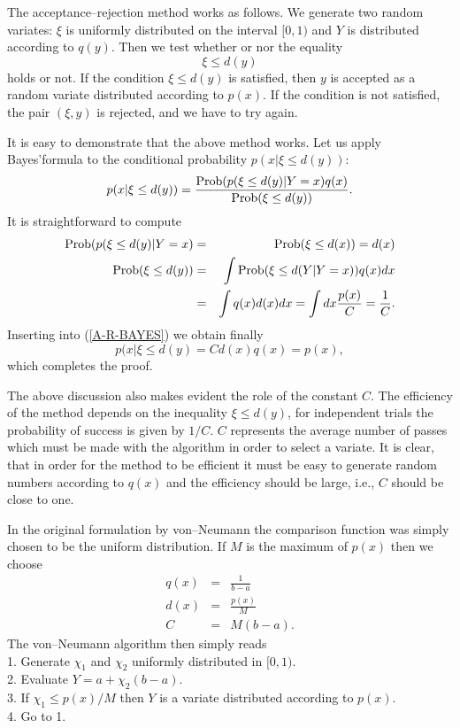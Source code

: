 The acceptance--rejection method works as follows. We generate two
random variates: $\xi$ is uniformly distributed on the interval
$[0,1)$ and $Y$ is distributed according to $q(y)$. Then we test
whether or nor the equality
\begin{equation*}
\xi \le d(y)
\end{equation*}
holds or not. If  the condition $\xi \le d(y)$ is satisfied, 
then $y$ is accepted as 
a random variate distributed according to $p(x)$.  If
the condition is not satisfied, the pair $(\xi,y)$ is rejected, 
and we have to try again.

It is easy to demonstrate that the above method works. Let us apply
Bayes'formula to the conditional probability $p(x|\xi \le d(y))$:
\begin{equation}
\label{A-R-BAYES}
p(x|\xi \le d(y)) = \frac{{\rm Prob}(p(\xi \le d(y)|Y=x)q(x)}
                  {{\rm Prob}(\xi \le d(y))}.
\end{equation}
It is straightforward to compute
\begin{eqnarray*}
{\rm Prob}(p(\xi \le d(y)|Y=x) &=& {\rm Prob}(\xi \le d(x)) = 
          d(x) \\
{\rm Prob}(\xi \le d(y)) & = & \int {\rm Prob}(\xi \le d(Y|Y=x)) q(x) dx \\
               &= & \int q(x) d(x)dx = \int dx \frac{p(x)}{C} = 
                   \frac{1}{C}.
\end{eqnarray*}
Inserting into (\ref{A-R-BAYES}) we obtain finally
\begin{equation*}
p(x|\xi \le d(y) = Cd(x)q(x)=p(x),
\end{equation*}
which completes the proof.

The above discussion also makes evident the role of the constant
$C$. The efficiency of the method depends on the inequality $\xi \le 
d(y)$, for independent trials the probability of success is given 
by $1/C$. $C$ represents the average number of passes which must 
be made with the algorithm in order to select a variate. It is 
clear, that in order for the method to be efficient it must be 
easy to generate random numbers according to $q(x)$ and the 
efficiency should be large, i.e., $C$ should be close to one.

In the original formulation by von--Neumann the comparison 
function was simply chosen to be the uniform distribution. If
$M$ is the maximum of $p(x)$ then we choose
\begin{eqnarray*}
q(x) & = & \frac{1}{b-a} \\
d(x) & = & \frac{p(x)}{M} \\
C & = & M(b-a).
\end{eqnarray*}
The von--Neumann algorithm then simply reads \\
1. Generate $\chi_1$ and $\chi_2$ uniformly distributed in 
    $[0,1)$. \\
2. Evaluate $Y=a+\chi_2(b-a)$. \\
3. If $\chi_1 \le p(x)/M$ then $Y$ is a variate distributed 
    according to $p(x)$. \\
4. Go to 1.

